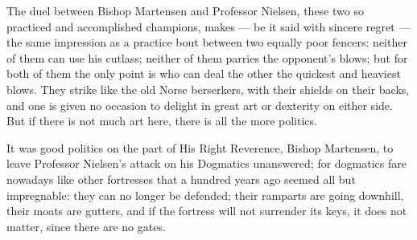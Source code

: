 \documentclass[12pt,a4paper,openany]{book}
\newcommand{\opage}[1]{\marginnote{\footnotesize\textit{[#1]}}}
\begin{document}
The duel between Bishop Martensen and Professor Nielsen, these two
so practiced and accomplished champions, makes --- be it said with
sincere regret --- the same impression as a practice bout between two
equally poor fencers: neither of them can use his cutlass; neither of
them parries the opponent's blows; but
\opage{91}for both of them the only point is who can deal the other the
quickest and heaviest blows. They strike like the old Norse berserkers,
with their shields on their backs, and one is given no occasion to
delight in great art or dexterity on either side. But if there is not
much art here, there is all the more politics.

It was good politics on the part of His Right Reverence, Bishop
Martensen, to leave Professor Nielsen's attack on his Dogmatics
unanswered; for dogmatics fare nowadays like other fortresses that a
hundred years ago seemed all but impregnable: they can no longer be
defended; their ramparts are going downhill, their moats are gutters,
and if the fortress will not surrender its keys, it does not matter,
since there are no gates.
\end{document}
